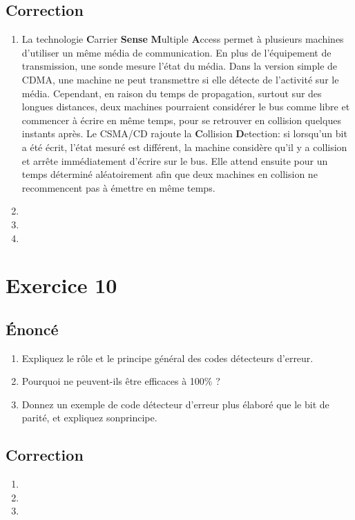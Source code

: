\documentclass[a4paper, 11pt, titlepage]{article}
\begin{document}
\subsection{Correction}
\begin{enumerate}[label=(\alph*)]
\item La technologie \textbf{C}arrier \textbf{Sense} \textbf{M}ultiple \textbf{A}ccess permet à plusieurs machines d'utiliser un même média de communication. En plus de l'équipement de transmission, une sonde mesure l'état du média. Dans la version simple de CDMA, une machine ne peut transmettre si elle détecte de l'activité sur le média. Cependant, en raison du temps de propagation, surtout sur des longues distances, deux machines pourraient considérer le bus comme libre et commencer à écrire en même temps, pour se retrouver en collision quelques instants après. Le CSMA/CD rajoute la \textbf{C}ollision \textbf{D}etection: si lorsqu'un bit a été écrit, l'état mesuré est différent, la machine considère qu'il y a collision et arrête immédiatement d'écrire sur le bus. Elle attend ensuite pour un temps déterminé aléatoirement afin que deux machines en collision ne recommencent pas à émettre en même temps. 
\item

\item 

\item 

\end{enumerate}


\section{Exercice 10}
\subsection{\'Enoncé}
\begin{enumerate}[label=(\alph*)]
  \item Expliquez le rôle et le principe général des codes détecteurs d’erreur.
  \item Pourquoi ne peuvent-ils être efficaces à 100\% ?
  \item Donnez un exemple de code détecteur d’erreur plus élaboré que le bit de parité, et expliquez sonprincipe.
\end{enumerate}

\subsection{Correction}
\begin{enumerate}[label=(\alph*)]
\item

\item

\item

\end{enumerate}
\end{document}
